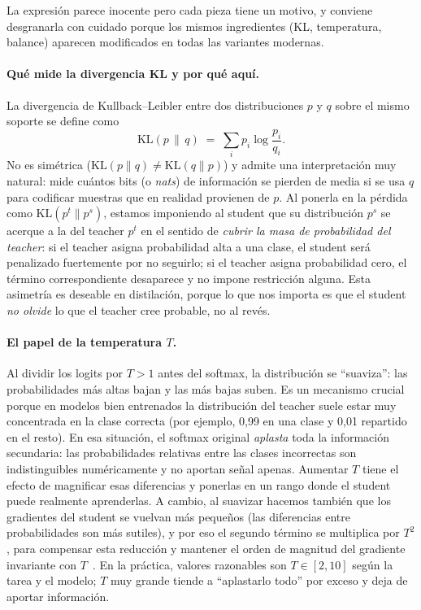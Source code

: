 \documentclass[11pt,a4paper]{article}
\begin{document}
La expresión parece inocente pero cada pieza tiene un motivo, y conviene desgranarla con cuidado porque los mismos ingredientes (KL, temperatura, balance) aparecen modificados en todas las variantes modernas.

\paragraph{Qué mide la divergencia KL y por qué aquí.} La divergencia de Kullback--Leibler entre dos distribuciones $p$ y $q$ sobre el mismo soporte se define como
\[
\mathrm{KL}(p\,\|\,q) \;=\; \sum_{i} p_i \log\!\frac{p_i}{q_i}.
\]
No es simétrica ($\mathrm{KL}(p\|q)\neq \mathrm{KL}(q\|p)$) y admite una interpretación muy natural: mide cuántos bits (o \emph{nats}) de información se pierden de media si se usa $q$ para codificar muestras que en realidad provienen de $p$. Al ponerla en la pérdida como $\mathrm{KL}(p^t\|p^s)$, estamos imponiendo al student que su distribución $p^s$ se acerque a la del teacher $p^t$ en el sentido de \emph{cubrir la masa de probabilidad del teacher}: si el teacher asigna probabilidad alta a una clase, el student será penalizado fuertemente por no seguirlo; si el teacher asigna probabilidad cero, el término correspondiente desaparece y no impone restricción alguna. Esta asimetría es deseable en distilación, porque lo que nos importa es que el student \emph{no olvide} lo que el teacher cree probable, no al revés.

\paragraph{El papel de la temperatura $T$.} Al dividir los logits por $T>1$ antes del softmax, la distribución se ``suaviza'': las probabilidades más altas bajan y las más bajas suben. Es un mecanismo crucial porque en modelos bien entrenados la distribución del teacher suele estar muy concentrada en la clase correcta (por ejemplo, 0,99 en una clase y 0,01 repartido en el resto). En esa situación, el softmax original \emph{aplasta} toda la información secundaria: las probabilidades relativas entre las clases incorrectas son indistinguibles numéricamente y no aportan señal apenas. Aumentar $T$ tiene el efecto de magnificar esas diferencias y ponerlas en un rango donde el student puede realmente aprenderlas. A cambio, al suavizar hacemos también que los gradientes del student se vuelvan más pequeños (las diferencias entre probabilidades son más sutiles), y por eso el segundo término se multiplica por $T^2$, para compensar esta reducción y mantener el orden de magnitud del gradiente invariante con $T$~\cite{hinton2015distilling}. En la práctica, valores razonables son $T\in[2,10]$ según la tarea y el modelo; $T$ muy grande tiende a ``aplastarlo todo'' por exceso y deja de aportar información.
\end{document}
